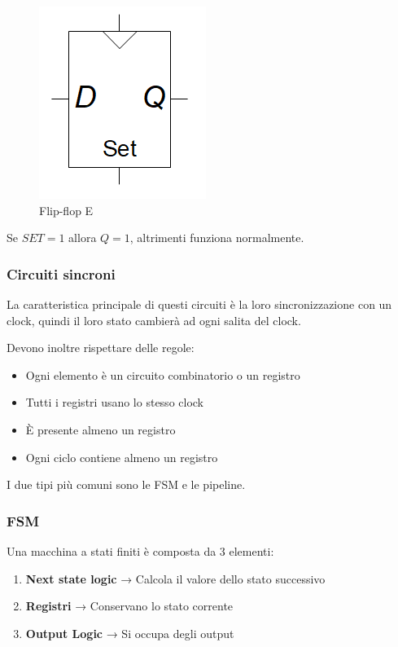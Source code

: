 \documentclass{article}
\begin{document}
\begin{itemize}
    \begin{figure}[ht]
        \centering
        \includegraphics[width=0.3\linewidth]{ffS.png}
        \caption{Flip-flop E}
        \label{fig:ff_S}
    \end{figure}

    Se $SET = 1$ allora $Q=1$, altrimenti funziona normalmente.
    
\end{itemize}

\subsubsection{Circuiti sincroni}

La caratteristica principale di questi circuiti è la loro sincronizzazione con un clock, quindi il loro stato cambierà ad ogni salita del clock.\newline

Devono inoltre rispettare delle regole:
\begin{itemize}
    \item Ogni elemento è un circuito combinatorio o un registro
    \item Tutti i registri usano lo stesso clock 
    \item È presente almeno un registro
    \item Ogni ciclo contiene almeno un registro
\end{itemize}

\vspace{5pt}

I due tipi più comuni sono le FSM e le pipeline.

\newpage

\subsubsection{FSM}

Una macchina a stati finiti è composta da 3 elementi:
\begin{enumerate}
    \item \textbf{Next state logic} → Calcola il valore dello stato successivo
    \item \textbf{Registri} → Conservano lo stato corrente
    \item \textbf{Output Logic} → Si occupa degli output
            
\end{enumerate}
\end{document}

